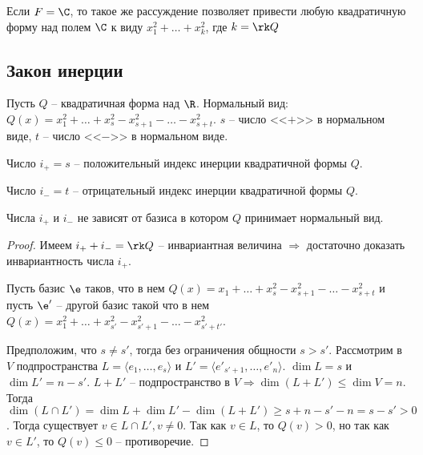 \begin{Comment}
  Если $F = \C$, то такое же рассуждение позволяет привести любую квадратичную форму над полем $\C$ к виду $x_1^2 + \ldots + x_k^2$, где $k = \rk Q$
\end{Comment}

\subsection*{Закон инерции}
%

Пусть $Q$ -- квадратичная форма над $\R$. Нормальный вид: $Q(x) = x_1^2 + \ldots + x_s^2 - x_{s+1}^2 - \ldots - x_{s + t}^2$. $s$ -- число <<$+$>> в нормальном виде, $t$ -- число <<$-$>> в нормальном виде.

\begin{Def}
  Число $i_+ = s$ --  положительный индекс инерции квадратичной формы $Q$.
\end{Def}

\begin{Def}
  Число $i_- = t$ --  отрицательный индекс инерции квадратичной формы $Q$.
\end{Def}

\begin{Theorem}
  Числа $i_+$ и $i_-$ не зависят от базиса в котором $Q$ принимает нормальный вид.
  \begin{proof}
    Имеем $i_+ + i_- = \rk Q$ -- инвариантная величина $\Rightarrow$ достаточно доказать инвариантность числа $i_+$.

    Пусть базис $\e$ таков, что в нем $Q(x) = x_1 + \ldots + x_s^2 - x_{s + 1}^2 - \ldots - x_{s + t}^2$ и пусть $\e'$ -- другой базис такой что в нем $Q(x) = x_1^2 + \ldots + x_{s'}^2 - x_{s' + 1}^2 - \ldots - x_{s' + t'}^2$.

    Предположим, что $s \neq s'$, тогда без ограничения общности $s > s'$. Рассмотрим в $V$ подпространства $L = \langle e_1, \ldots, e_s \rangle$ и $L' = \langle e'_{s' + 1}, \ldots, e'_n \rangle$. $\dim L = s$ и $\dim L' = n - s'$. $L + L'$ -- подпространство в $V \Rightarrow \dim(L + L') \leqslant \dim V = n$. Тогда $\dim(L \cap L') = \dim L + \dim L' - \dim(L + L') \geqslant s + n - s' - n = s - s' > 0$. Тогда существует $v \in L \cap L', v \neq 0$. Так как $v \in L$, то $Q(v) > 0$, но так как $v \in L'$, то $Q(v) \leqslant 0$ -- противоречие.
  \end{proof}
\end{Theorem}

